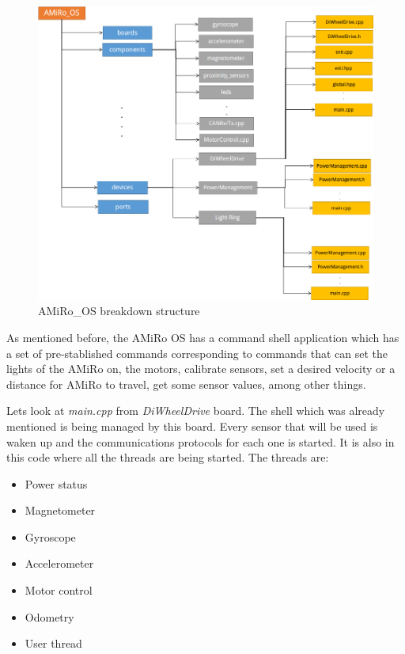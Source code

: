 \documentclass[12pt]{report}%
\begin{document}
\begin{figure}[ht]
	\centering
	\includegraphics[width=\textwidth]{AMiRo_OS}
    \caption{AMiRo\_OS breakdown structure}
    \label{fig:OS}
\end{figure}

As mentioned before, the AMiRo OS has a command shell application which has a set of pre-stablished commands corresponding to commands that can set the lights of the AMiRo on, the motors, calibrate sensors, set a desired velocity or a distance for AMiRo to travel, get some sensor values, among other things.

Lets look at \textit{main.cpp} from \textit{DiWheelDrive} board. The shell which was already mentioned is being managed by this board. Every sensor that will be used is waken up and the communications protocols for each one is started. It is also in this code where all the threads are being started. The threads are:

\begin{itemize}
  \item Power status
  \item Magnetometer
	\item Gyroscope
	\item Accelerometer
	\item Motor control
	\item Odometry
	\item User thread
\end{itemize}
\end{document}
